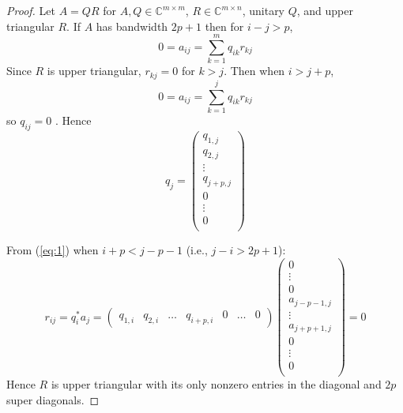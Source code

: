 \documentclass{article}
\numberwithin{pic}{section}
\numberwithin{lem}{section}
\numberwithin{thm}{section}
\numberwithin{cor}{section}
\theoremstyle{definition}
\numberwithin{ex}{section}
\numberwithin{defn}{section}
\theoremstyle{definition}
\theoremstyle{remark}
\newcommand{\C}{\ensuremath{\mathbb{C}}} %
\begin{document}
\begin{proof}
  
Let $A = QR$ for $A,Q \in \C^{m \times m}$, $R \in \C^{m \times n}$, unitary $Q$, and upper triangular $R$. If $A$ has bandwidth $2p +1$ then for $i - j > p$, 
	$$ 0 = a_{ij} = \sum_{k = 1}^{m} q_{ik}r_{kj}$$
Since $R$ is upper triangular, $r_{kj} = 0$ for $k > j$. Then when $i > j + p$,
	$$ 0 = a_{ij} = \sum_{k = 1}^{j} q_{ik}r_{kj}$$
so $q_{ij} = 0$ . Hence 
	\begin{equation} \label{eq:1}
		q_{j} = \begin{pmatrix} 
			q_{1,j} \\
			q_{2,j} \\
			\vdots \\
			q_{j+p,j} \\
			0 \\
			\vdots \\
			0 \\
		\end{pmatrix}
	\end{equation}

From (\ref{eq:1}) when $i+p < j - p -1$ (i.e., $j - i > 2p + 1$):
	$$
		r_{ij} = q_i^* a_j =\begin{pmatrix}
			q_{1,i} & q_{2,i} &	\dots & q_{i+p,i} & 0 & \dots &	0 
		\end{pmatrix}\begin{pmatrix} 
		0 \\
		\vdots \\
		0 \\
		a_{j-p-1,j} \\
		\vdots \\
		a_{j+p+1,j} \\
		0 \\
		\vdots \\
		0 \\
		\end{pmatrix} = 0
	$$
Hence $R$ is upper triangular with its only nonzero entries in the diagonal and $2p$ super diagonals.
\end{proof}
\end{document}
